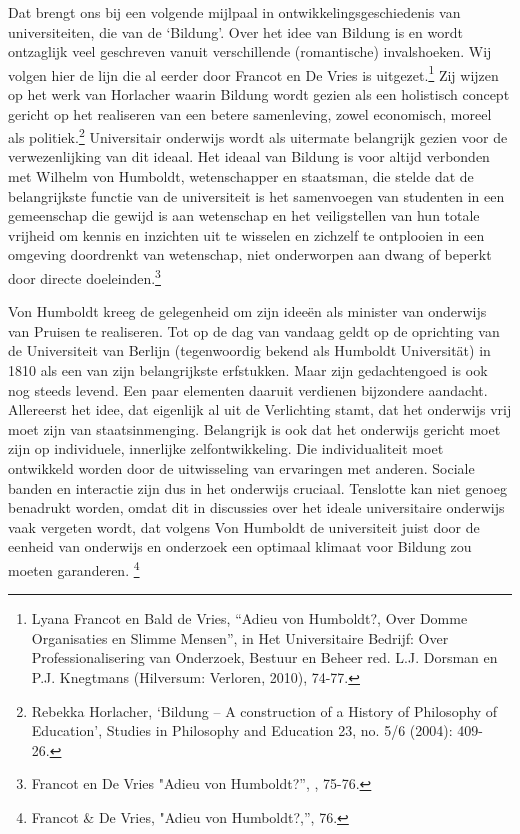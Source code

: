 \documentclass[empirical, authordate, ]{new-jote-article}
\begin{document}
	Dat brengt ons bij een volgende mijlpaal in ontwikkelingsgeschiedenis van universiteiten, die van de ‘Bildung'. Over het idee van Bildung is en wordt ontzaglijk veel geschreven vanuit verschillende (romantische) invalshoeken. Wij volgen hier de lijn die al eerder door Francot en De Vries is uitgezet.\footnote{Lyana Francot en Bald de Vries, “Adieu von Humboldt?, Over Domme Organisaties en Slimme Mensen”, in Het Universitaire Bedrijf: Over Professionalisering van Onderzoek, Bestuur en Beheer red. L.J. Dorsman en P.J. Knegtmans (Hilversum: Verloren, 2010), 74-77.} Zij wijzen op het werk van Horlacher waarin Bildung wordt gezien als een holistisch concept gericht op het realiseren van een betere samenleving, zowel economisch, moreel als politiek.\footnote{Rebekka Horlacher, ‘Bildung -- A construction of a History of Philosophy of Education', Studies in Philosophy and Education 23, no. 5/6 (2004): 409-26.} Universitair onderwijs wordt als uitermate belangrijk gezien voor de verwezenlijking van dit ideaal. Het ideaal van Bildung is voor altijd verbonden met Wilhelm von Humboldt, wetenschapper en staatsman, die stelde dat de belangrijkste functie van de universiteit is het samenvoegen van studenten in een gemeenschap die gewijd is aan wetenschap en het veiligstellen van hun totale vrijheid om kennis en inzichten uit te wisselen en zichzelf te ontplooien in een omgeving doordrenkt van wetenschap, niet onderworpen aan dwang of beperkt door directe doeleinden.\footnote{Francot en De Vries "Adieu von Humboldt?”, , 75-76.}



	Von Humboldt kreeg de gelegenheid om zijn ideeën als minister van onderwijs van Pruisen te realiseren. Tot op de dag van vandaag geldt op de oprichting van de Universiteit van Berlijn (tegenwoordig bekend als Humboldt Universität) in 1810 als een van zijn belangrijkste erfstukken. Maar zijn gedachtengoed is ook nog steeds levend. Een paar elementen daaruit verdienen bijzondere aandacht. Allereerst het idee, dat eigenlijk al uit de Verlichting stamt, dat het onderwijs vrij moet zijn van staatsinmenging. Belangrijk is ook dat het onderwijs gericht moet zijn op individuele, innerlijke zelfontwikkeling. Die individualiteit moet ontwikkeld worden door de uitwisseling van ervaringen met anderen. Sociale banden en interactie zijn dus in het onderwijs cruciaal. Tenslotte kan niet genoeg benadrukt worden, omdat dit in discussies over het ideale universitaire onderwijs vaak vergeten wordt, dat volgens Von Humboldt de universiteit juist door de eenheid van onderwijs en onderzoek een optimaal klimaat voor Bildung zou moeten garanderen.\textsuperscript{ }\footnote{Francot \& De Vries, "Adieu von Humboldt?,”, 76.}
\end{document}
